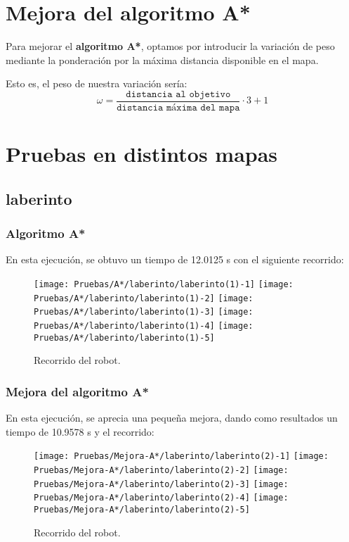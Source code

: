 \documentclass[a4paper, 11pt]{article}
\begin{document}
\section{Mejora del algoritmo A*}
	Para mejorar el \textbf{algoritmo A*}, optamos por introducir la variación de peso mediante la
	ponderación por la máxima distancia disponible en el mapa.
	
	Esto es, el peso de nuestra variación sería:
	$$\omega = \frac{\texttt{distancia al objetivo}}{\texttt{distancia máxima del mapa}} \cdot 3 + 1$$

\section{Pruebas en distintos mapas}
	\subsection{laberinto}
		\subsubsection{Algoritmo A*}
			En esta ejecución, se obtuvo un tiempo de 12.0125 s con el siguiente recorrido:
			\begin{figure}[H]
				\centering
				\texttt{[image: Pruebas/A*/laberinto/laberinto(1)-1]}
				\texttt{[image: Pruebas/A*/laberinto/laberinto(1)-2]}
				\texttt{[image: Pruebas/A*/laberinto/laberinto(1)-3]}
				\texttt{[image: Pruebas/A*/laberinto/laberinto(1)-4]}
				\texttt{[image: Pruebas/A*/laberinto/laberinto(1)-5]}
				\caption{Recorrido del robot.}
				\label{A-lab}
			\end{figure}
			
		\subsubsection{Mejora del algoritmo A*}
			En esta ejecución, se aprecia una pequeña mejora, dando como resultados un tiempo de 10.9578 s
			y el recorrido: 
			
			\begin{figure}[H]
				\centering
				\texttt{[image: Pruebas/Mejora-A*/laberinto/laberinto(2)-1]}
				\texttt{[image: Pruebas/Mejora-A*/laberinto/laberinto(2)-2]}
				\texttt{[image: Pruebas/Mejora-A*/laberinto/laberinto(2)-3]}
				\texttt{[image: Pruebas/Mejora-A*/laberinto/laberinto(2)-4]}
				\texttt{[image: Pruebas/Mejora-A*/laberinto/laberinto(2)-5]}
				\caption{Recorrido del robot.}
				\label{MA-lab}
			\end{figure}
\end{document}
